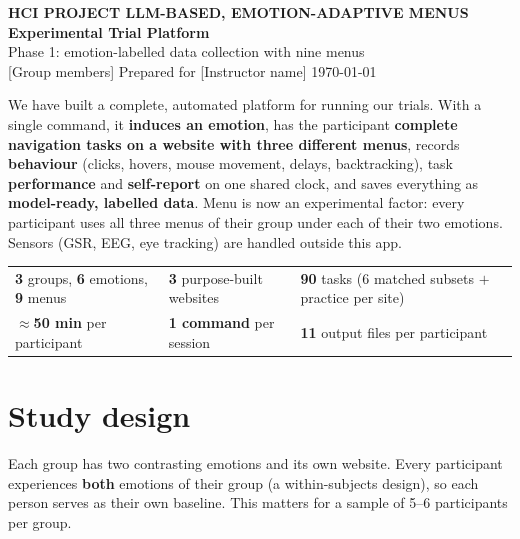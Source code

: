 \documentclass[11pt,a4paper]{article}
\begin{document}
\begin{center}
  {\sffamily\small\color{accent}\textbf{HCI PROJECT \textbullet{} LLM-BASED, EMOTION-ADAPTIVE MENUS}}\\[6pt]
  {\sffamily\huge\bfseries\color{ink} Experimental Trial Platform}\\[4pt]
  {\sffamily\large\color{muted} Phase 1: emotion-labelled data collection with nine menus}\\[10pt]
  {\small [Group members] \quad\textbullet\quad Prepared for [Instructor name] \quad\textbullet\quad \today}
\end{center}
\vspace{4pt}

\begin{keybox}[At a glance]
We have built a complete, automated platform for running our trials. With a single command, it
\textbf{induces an emotion}, has the participant \textbf{complete navigation tasks on a website with three
different menus}, records \textbf{behaviour} (clicks, hovers, mouse movement, delays, backtracking), task
\textbf{performance} and \textbf{self-report} on one shared clock, and saves everything as
\textbf{model-ready, labelled data}. Menu is now an experimental factor: every participant uses all three menus of
their group under each of their two emotions. Sensors (GSR, EEG, eye tracking) are handled outside this app.

\smallskip
\begin{tabularx}{\linewidth}{@{}LLL@{}}
\textbf{3} groups, \textbf{6} emotions, \textbf{9} menus & \textbf{3} purpose-built websites & \textbf{90} tasks (6 matched subsets $+$ practice per site)\\
$\approx$\textbf{50 min} per participant & \textbf{1 command} per session & \textbf{11} output files per participant
\end{tabularx}
\end{keybox}

\section{Study design}

Each group has two contrasting emotions and its own website. Every participant experiences
\textbf{both} emotions of their group (a within-subjects design), so each person serves as their own
baseline. This matters for a sample of 5--6 participants per group.
\end{document}
